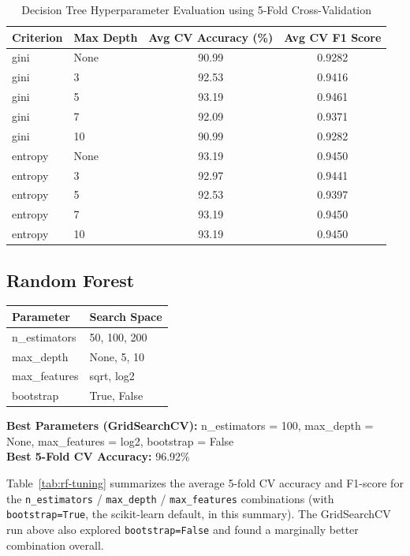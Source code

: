 \documentclass[12pt,a4paper]{article}
\begin{document}
\begin{table}[H]
\centering
\caption{Decision Tree Hyperparameter Evaluation using 5-Fold Cross-Validation}
\label{tab:dt-tuning}
\begin{tabular}{llcc}
\toprule
Criterion & Max Depth & Avg CV Accuracy (\%) & Avg CV F1 Score \\
\midrule
gini    & None & 90.99 & 0.9282 \\
gini    & 3    & 92.53 & 0.9416 \\
gini    & 5    & 93.19 & 0.9461 \\
gini    & 7    & 92.09 & 0.9371 \\
gini    & 10   & 90.99 & 0.9282 \\
entropy & None & 93.19 & 0.9450 \\
entropy & 3    & 92.97 & 0.9441 \\
entropy & 5    & 92.53 & 0.9397 \\
entropy & 7    & 93.19 & 0.9450 \\
entropy & 10   & 93.19 & 0.9450 \\
\bottomrule
\end{tabular}
\end{table}

\subsection{Random Forest}
\begin{tabular}{ll}
\toprule
Parameter & Search Space\\
\midrule
n\_estimators & 50, 100, 200 \\
max\_depth & None, 5, 10 \\
max\_features & sqrt, log2 \\
bootstrap & True, False \\
\bottomrule
\end{tabular}

\vspace{0.3cm}
\textbf{Best Parameters (GridSearchCV):} n\_estimators = 100, max\_depth = None, max\_features = log2, bootstrap = False \\
\textbf{Best 5-Fold CV Accuracy:} 96.92\%

\vspace{0.3cm}
Table~\ref{tab:rf-tuning} summarizes the average 5-fold CV accuracy and F1-score for the \texttt{n\_estimators} / \texttt{max\_depth} / \texttt{max\_features} combinations (with \texttt{bootstrap=True}, the scikit-learn default, in this summary). The GridSearchCV run above also explored \texttt{bootstrap=False} and found a marginally better combination overall.
\end{document}
